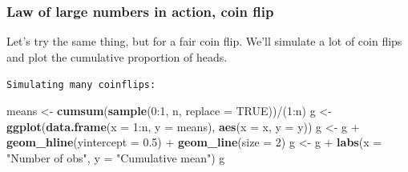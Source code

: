 \documentclass[]{article}
\newenvironment{Shaded}{\begin{snugshade}}{\end{snugshade}}
\newcommand{\KeywordTok}[1]{\textcolor[rgb]{0.13,0.29,0.53}{\textbf{{#1}}}}
\newcommand{\DataTypeTok}[1]{\textcolor[rgb]{0.13,0.29,0.53}{{#1}}}
\newcommand{\DecValTok}[1]{\textcolor[rgb]{0.00,0.00,0.81}{{#1}}}
\newcommand{\FloatTok}[1]{\textcolor[rgb]{0.00,0.00,0.81}{{#1}}}
\newcommand{\StringTok}[1]{\textcolor[rgb]{0.31,0.60,0.02}{{#1}}}
\newcommand{\OtherTok}[1]{\textcolor[rgb]{0.56,0.35,0.01}{{#1}}}
\newcommand{\NormalTok}[1]{{#1}}
\begin{document}
\subsubsection{Law of large numbers in action, coin
flip}\label{law-of-large-numbers-in-action-coin-flip}

Let's try the same thing, but for a fair coin flip. We'll simulate a lot
of coin flips and plot the cumulative proportion of heads.

\vspace{1pc}

\verb;Simulating many coinflips:;

\begin{Shaded}
\begin{Highlighting}[]
\NormalTok{means <-}\StringTok{ }\KeywordTok{cumsum}\NormalTok{(}\KeywordTok{sample}\NormalTok{(}\DecValTok{0}\NormalTok{:}\DecValTok{1}\NormalTok{, n, }\DataTypeTok{replace =} \OtherTok{TRUE}\NormalTok{))/(}\DecValTok{1}\NormalTok{:n)}
\NormalTok{g <-}\StringTok{ }\KeywordTok{ggplot}\NormalTok{(}\KeywordTok{data.frame}\NormalTok{(}\DataTypeTok{x =} \DecValTok{1}\NormalTok{:n, }\DataTypeTok{y =} \NormalTok{means), }\KeywordTok{aes}\NormalTok{(}\DataTypeTok{x =} \NormalTok{x, }\DataTypeTok{y =} \NormalTok{y))}
\NormalTok{g <-}\StringTok{ }\NormalTok{g +}\StringTok{ }\KeywordTok{geom_hline}\NormalTok{(}\DataTypeTok{yintercept =} \FloatTok{0.5}\NormalTok{) +}\StringTok{ }\KeywordTok{geom_line}\NormalTok{(}\DataTypeTok{size =} \DecValTok{2}\NormalTok{)}
\NormalTok{g <-}\StringTok{ }\NormalTok{g +}\StringTok{ }\KeywordTok{labs}\NormalTok{(}\DataTypeTok{x =} \StringTok{"Number of obs"}\NormalTok{, }\DataTypeTok{y =} \StringTok{"Cumulative mean"}\NormalTok{)}
\NormalTok{g}
\end{Highlighting}
\end{Shaded}
\end{document}

